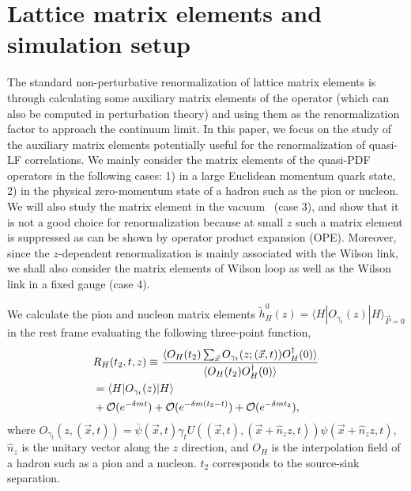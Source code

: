 \section{Lattice matrix elements and simulation setup}\label{sec:setup}

The standard non-perturbative renormalization of lattice matrix elements is through 
calculating some auxiliary matrix elements of the operator (which can also be computed in perturbation theory) and using them as the 
renormalization factor to approach the continuum limit. 
In this paper, we focus on the study of the auxiliary matrix elements 
potentially useful for the renormalization of quasi-LF correlations. We
mainly consider the matrix elements of the quasi-PDF operators in the 
following cases: 1) in a large Euclidean momentum quark state, 2) in the
physical zero-momentum state of a hadron such as the pion or nucleon.
We will also study the matrix element in the vacuum~\cite{Braun:2018brg} (case 3), and show that it is not a good choice for renormalization because at small $z$ such a  matrix element is suppressed as can be shown by operator
product expansion (OPE). 
Moreover, since the $z$-dependent renormalization is mainly associated 
with the Wilson link, we shall also consider the matrix elements of Wilson loop as well as the Wilson link in a fixed gauge (case 4).  

We calculate the pion and nucleon matrix elements $\tilde{h}^{0}_{H}(z)=\langle H| O_{\gamma_t}(z)|H \rangle_{\vec{P}=0}$ in the rest frame evaluating the following three-point function,
\begin{align}\label{eq:hadron}
&R_{H}(t_2,t,z)\equiv\frac{\langle O_H(t_2)\sum_{\vec{x}}O_{\gamma_t}(z;(\vec{x},t))O_H^{\dagger}(0)\rangle}{\langle O_H(t_2)O_H^{\dagger}(0)\rangle}\nonumber\\
&=\langle H| O_{\gamma_t}(z)|H \rangle\nonumber\\
&+{\cal O}(e^{-\delta m t})+{\cal O}(e^{-\delta m (t_2-t)})+{\cal O}(e^{-\delta m t_2}),
\end{align}
where $O_{\gamma_t}(z,(\vec{x},t))=\bar{\psi}(\vec{x},t) \gamma_t U((\vec{x},t),(\vec{x}+\hat{n}_z z,t)) \psi (\vec{x}+\hat{n}_z z,t)$, $\hat{n}_z$ is the unitary vector along the $z$ direction, and $O_H$ is the interpolation field of a hadron such as a pion and a nucleon.  $t_2$ corresponds to the source-sink separation. 

